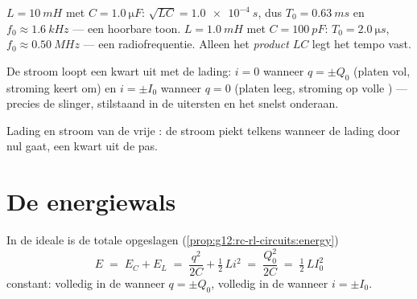 \begin{example}\label{ex:g12:rlc-oscillations:firstnumbers}
$L = \qty{10}{mH}$ met $C = \qty{1.0}{\micro F}$:
$\sqrt{LC} = \qty{1.0e-4}{s}$, dus $T_0 = \qty{0.63}{ms}$ en
$f_0 \approx \qty{1.6}{kHz}$ --- een hoorbare toon. $L = \qty{1.0}{mH}$ met
$C = \qty{100}{pF}$: $T_0 = \qty{2.0}{\micro s}$,
$f_0 \approx \qty{0.50}{MHz}$ --- een radiofrequentie. Alleen het
\emph{product} $LC$ legt het tempo vast.
\end{example}

\begin{remark}\label{rem:g12:rlc-oscillations:quarter}
De stroom loopt een kwart  uit  met de lading: $i = 0$ wanneer
$q = \pm Q_0$ (platen vol, stroming keert om) en $i = \pm I_0$ wanneer
$q = 0$ (platen leeg, stroming op volle ) --- precies de slinger,
stilstaand in de uitersten en het snelst onderaan.
\end{remark}

\begin{omfigure}

{\small Lading en stroom van de vrije : de stroom piekt telkens
wanneer de lading door nul gaat, een kwart  uit de pas.}
\end{omfigure}

\section{De energiewals}

\begin{proposition}\label{prop:g12:rlc-oscillations:energy}
In de ideale  is de totale opgeslagen 
(\cref{prop:g12:rc-rl-circuits:energy})
\[
E \;=\; E_C + E_L \;=\; \frac{q^2}{2C} + \tfrac12\,L i^2
\;=\; \frac{Q_0^2}{2C} \;=\; \tfrac12\,L I_0^2
\]
constant: volledig in de  wanneer $q = \pm Q_0$, volledig in de
 wanneer $i = \pm I_0$.
\end{proposition}

